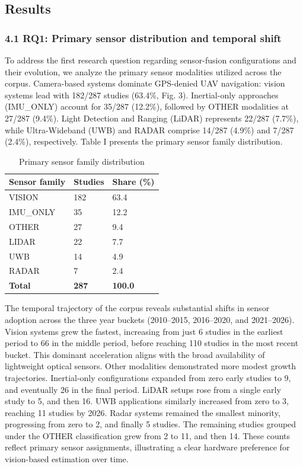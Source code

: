 \documentclass[conference]{IEEEtran}
\begin{document}
\subsection{Results}


\subsubsection{4.1 RQ1: Primary sensor distribution and temporal shift}


To address the first research question regarding sensor-fusion configurations and their evolution, we analyze the primary sensor modalities utilized across the corpus. Camera-based systems dominate GPS-denied UAV navigation: vision systems lead with 182/287 studies (63.4\%, Fig. 3). Inertial-only approaches (IMU\_ONLY) account for 35/287 (12.2\%), followed by OTHER modalities at 27/287 (9.4\%). Light Detection and Ranging (LiDAR) represents 22/287 (7.7\%), while Ultra-Wideband (UWB) and RADAR comprise 14/287 (4.9\%) and 7/287 (2.4\%), respectively. Table I presents the primary sensor family distribution.



\begin{table}[htbp]
\centering
\caption{Primary sensor family distribution}
\label{tab:1}
\begin{tabular}{l l l}
\hline
Sensor family & Studies & Share (\%) \\
\hline
VISION & 182 & 63.4 \\
\hline
IMU\_ONLY & 35 & 12.2 \\
\hline
OTHER & 27 & 9.4 \\
\hline
LIDAR & 22 & 7.7 \\
\hline
UWB & 14 & 4.9 \\
\hline
RADAR & 7 & 2.4 \\
\hline
\textbf{Total} & \textbf{287} & \textbf{100.0} \\
\hline
\end{tabular}
\end{table}



The temporal trajectory of the corpus reveals substantial shifts in sensor adoption across the three year buckets (2010–2015, 2016–2020, and 2021–2026). Vision systems grew the fastest, increasing from just 6 studies in the earliest period to 66 in the middle period, before reaching 110 studies in the most recent bucket. This dominant acceleration aligns with the broad availability of lightweight optical sensors. Other modalities demonstrated more modest growth trajectories. Inertial-only configurations expanded from zero early studies to 9, and eventually 26 in the final period. LiDAR setups rose from a single early study to 5, and then 16. UWB applications similarly increased from zero to 3, reaching 11 studies by 2026. Radar systems remained the smallest minority, progressing from zero to 2, and finally 5 studies. The remaining studies grouped under the OTHER classification grew from 2 to 11, and then 14. These counts reflect primary sensor assignments, illustrating a clear hardware preference for vision-based estimation over time.
\end{document}
